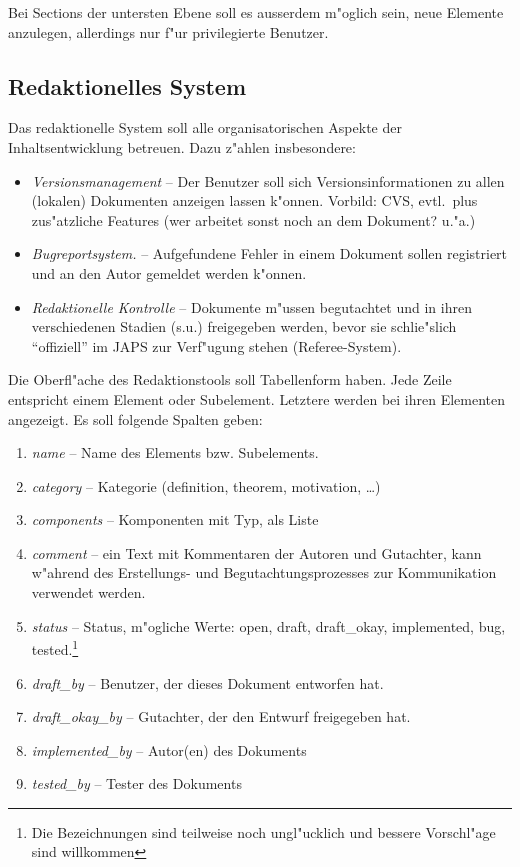 \documentclass[a4paper,12pt]{article}
\begin{document}
Bei Sections der untersten Ebene soll es ausserdem m"oglich sein, neue Elemente
anzulegen, allerdings nur f"ur privilegierte Benutzer.


\subsection{Redaktionelles System}

Das redaktionelle System soll alle organisatorischen Aspekte der Inhaltsentwicklung
betreuen. Dazu z"ahlen insbesondere:

\begin{itemize}
\item \emph{Versionsmanagement} -- Der Benutzer soll sich Versionsinformationen zu allen
  (lokalen) Dokumenten anzeigen lassen k"onnen. Vorbild: CVS, evtl.\ plus zus"atzliche
  Features (wer arbeitet sonst noch an dem Dokument? u."a.)
\item \emph{Bugreportsystem.} -- Aufgefundene Fehler in einem Dokument sollen registriert und an
  den Autor gemeldet werden k"onnen.
\item \emph{Redaktionelle Kontrolle} -- Dokumente m"ussen begutachtet und in ihren
  verschiedenen Stadien (s.u.) freigegeben werden, bevor sie schlie"slich "`offiziell"' im
  JAPS zur Verf"ugung stehen (Referee-System).
\end{itemize}

Die Oberfl"ache des Redaktionstools soll Tabellenform haben. Jede Zeile entspricht einem
Element oder Subelement. Letztere werden bei ihren Elementen angezeigt. Es soll folgende
Spalten geben:
\begin{enumerate}
\item \emph{name} -- Name des Elements bzw. Subelements.
\item \emph{category} -- Kategorie  (definition, theorem, motivation, \ldots)
\item \emph{components} -- Komponenten mit Typ, als Liste
\item \emph{comment} -- ein Text mit Kommentaren der Autoren und Gutachter, kann w"ahrend
  des Erstellungs- und Begutachtungsprozesses zur Kommunikation verwendet werden.
\item \emph{status} -- Status, m"ogliche Werte: open, draft, draft\_okay, implemented, bug,
  tested.\footnote{Die Bezeichnungen sind teilweise noch ungl"ucklich und bessere
    Vorschl"age sind willkommen}
\item \emph{draft\_by} -- Benutzer, der dieses Dokument entworfen hat.
\item \emph{draft\_okay\_by} -- Gutachter, der den Entwurf freigegeben hat.
\item \emph{implemented\_by} -- Autor(en) des Dokuments
\item \emph{tested\_by} -- Tester des Dokuments
\end{enumerate}
\end{document}
